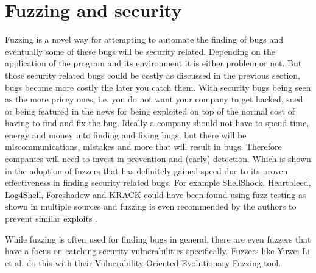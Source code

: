 \section{Fuzzing and security}
\label{intro:FussingSecurity}
Fuzzing is a novel way for attempting to automate the finding of bugs and eventually some of these bugs will be security related. Depending on the application of the program and its environment it is either problem or not. But those security related bugs could be costly as discussed in the previous section, bugs become more costly the later you 
catch them. With security bugs being seen as the more pricey ones, i.e. you do not want your company to get hacked, sued or being featured in the news for being exploited on top of the normal cost of having to find and fix the bug. 
Ideally a company should not have to spend time, energy and money into finding and fixing bugs, but there will be miscommunications, mistakes and more that will result in bugs. Therefore companies will need to invest in prevention and (early) detection. Which is shown in the adoption of fuzzers that has definitely gained speed due to its proven effectiveness in finding security related bugs. For example ShellShock, Heartbleed, Log4Shell, Foreshadow and KRACK could have been found using fuzz testing as shown in multiple sources \cite{HeartbleedViaFuzzing, 34ForeshadowViaFuzz, ShellShockViaFuzzing, Log4ShellViaFuzzing} and fuzzing is even recommended by the authors to prevent similar exploits \cite{35ForeshadowFuzzRecom, 33KrackViaFuzz}.

While fuzzing is often used for finding bugs in general, there are even fuzzers that have a focus on catching security vulnerabilities specifically. Fuzzers like Yuwei Li et al. \cite{32V-Fuzz} do this with their Vulnerability-Oriented Evolutionary Fuzzing tool.

